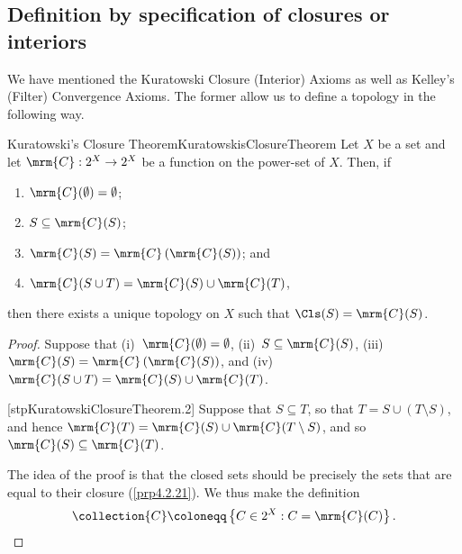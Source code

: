 \subsection{Definition by specification of closures or interiors}

We have mentioned the Kuratowski Closure (Interior) Axioms as well as Kelley's (Filter) Convergence Axioms.  The former allow us to define a topology in the following way.
\begin{thm}{Kuratowski's Closure Theorem}{KuratowskisClosureTheorem}
Let $X$ be a set and let $\mrm{C}:2^X\rightarrow 2^X$ be a function on the power-set of $X$.  Then, if
\begin{enumerate}
\item \label{enmKuratowskiClosureTheorem.i}$\mrm{C}(\emptyset )=\emptyset$;
\item \label{enmKuratowskiClosureTheorem.ii}$S\subseteq \mrm{C}(S)$;
\item \label{enmKuratowskiClosureTheorem.iii}$\mrm{C}(S)=\mrm{C}\left( \mrm{C}(S)\right)$; and
\item \label{enmKuratowskiClosureTheorem.iv}$\mrm{C}(S\cup T)=\mrm{C}(S)\cup \mrm{C}(T)$,
\end{enumerate}
then there exists a unique topology on $X$ such that $\Cls (S)=\mrm{C}(S)$.
\begin{proof}
Suppose that (i)~$\mrm{C}(\emptyset )=\emptyset$, (ii)~$S\subseteq \mrm{C}(S)$, (iii)~$\mrm{C}(S)=\mrm{C}\left( \mrm{C}(S)\right)$, and (iv)~$\mrm{C}(S\cup T)=\mrm{C}(S)\cup \mrm{C}(T)$.

[stpKuratowskiClosureTheorem.2]
Suppose that $S\subseteq T$, so that $T=S\cup (T\setminus S)$, and hence $\mrm{C}(T)=\mrm{C}(S)\cup \mrm{C}(T\setminus S)$, and  so $\mrm{C}(S)\subseteq \mrm{C}(T)$.

The idea of the proof is that the closed sets should be precisely the sets that are equal to their closure (\cref{prp4.2.21}).  We thus make the definition
\begin{equation}
\collection{C}\coloneqq \left\{ C\in 2^X:C=\mrm{C}(C)\right\} .
\end{equation}


\end{proof}
\end{thm}
